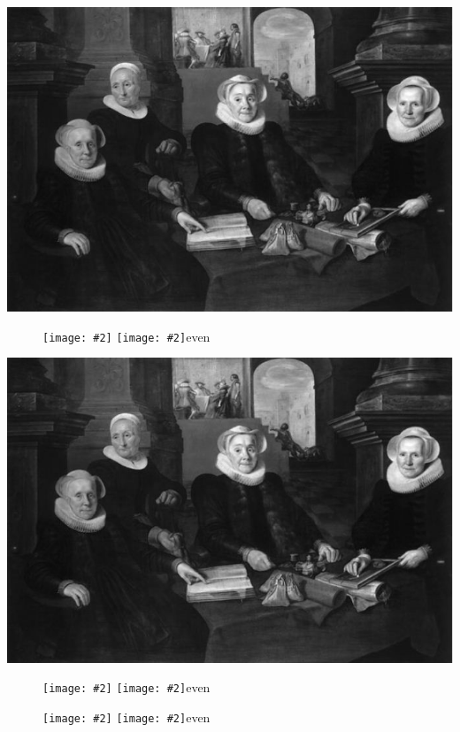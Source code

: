\documentclass{book}
\def\doubletakeimage#1#2{%
 
 \begin{figure}[tp]
        \clearpage
        \checkoddpage
         \ifoddpage       
            \hspace*{-\marginparwidth}\texttt{[image: \#2]}%
             \thispagestyle{caption}
       \else
      \hspace*{-\marginparwidth}\texttt{[image: \#2]}even \par%
          \thispagestyle{caption}
      \fi
      
  \end{figure}
}
\begin{document}
\includegraphics[width=\textwidth]{matron}\par%
\lipsum[1-4]
\doubletakeimage{matron}{stuartpearson}
\lipsum[1-10]
\includegraphics[width=\textwidth]{matron}%
\doubletakeimage{matron}{stuartpearson}
\lipsum[1-8]
\doubletakeimage{matron}{stuartpearson}
\lipsum[1-5]
\end{document}
